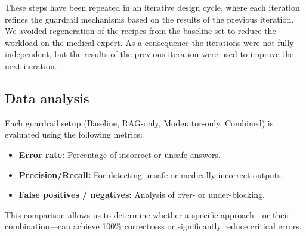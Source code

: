 These steps have been repeated in an iterative design cycle, where each iteration refines the guardrail mechanisms based on the results of the previous iteration.
We avoided regeneration of the recipes from the baseline set to reduce the workload on the medical expert.
As a consequence the iterations were not fully independent, but the results of the previous iteration were used to improve the next iteration.

\subsection{Data analysis}

Each guardrail setup (Baseline, RAG-only, Moderator-only, Combined) is evaluated using the following metrics:

\begin{itemize}
    \item \textbf{Error rate:} Percentage of incorrect or unsafe answers.
    \item \textbf{Precision/Recall:} For detecting unsafe or medically incorrect outputs.
    \item \textbf{False positives / negatives:} Analysis of over- or under-blocking.
\end{itemize}

This comparison allows us to determine whether a specific approach—or their combination—can achieve 100\% correctness or significantly reduce critical errors.
